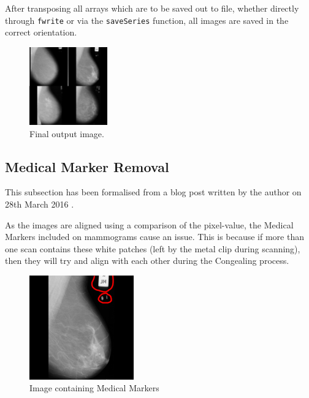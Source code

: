After transposing all arrays which are to be saved out to file, whether directly through \texttt{fwrite} or via the \texttt{saveSeries} function, all images are saved in the correct orientation.

\begin{figure}[H]
  \centering
  \includegraphics[width=0.3\textwidth]{Chapter2/technical-img/big_scan.jpg}
  \caption{Final output image.}
  \label{fig:final-output-4}
\end{figure}

\subsection{Medical Marker Removal}

This subsection has been formalised from a blog post written by the author on 28th March 2016 \cite{Collins_2016}.

As the images are aligned using a comparison of the pixel-value, the Medical Markers included on mammograms cause an issue. This is because if more than one scan contains these white patches (left by the metal clip during scanning), then they will try and align with each other during the \Gls{Congealing} process.

\begin{figure}[H]
  \centering
  \includegraphics[width=0.4\textwidth]{Chapter2/technical-img/mdb196.png}
  \caption{Image containing Medical Markers}
  \label{fig:med-markers}
\end{figure}

